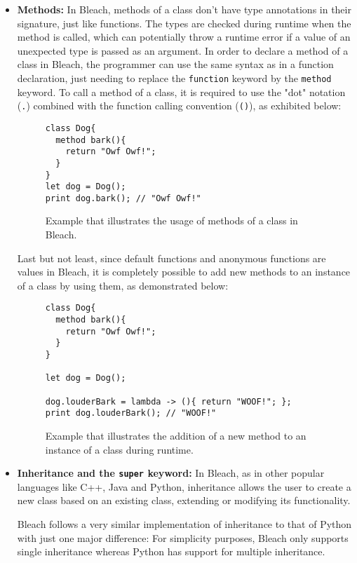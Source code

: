 \begin{itemize}
    \item \textbf{Methods:} In Bleach, methods of a class don't have type annotations in their signature, just like functions. The types are checked during runtime when the method is called, which can potentially throw a runtime error if a value of an unexpected type is passed as an argument. In order to declare a method of a class in Bleach, the programmer can use the same syntax as in a function declaration, just needing to replace the \texttt{function} keyword by the \texttt{method} keyword. To call a method of a class, it is required to use the "dot" notation (\texttt{.}) combined with the function calling convention (\texttt{()}), as exhibited below:
\begin{figure}[H]
    \centering
    \begin{lstlisting}
class Dog{
  method bark(){
    return "Owf Owf!";
  }
}
let dog = Dog();
print dog.bark(); // "Owf Owf!"
    \end{lstlisting}
    \caption{Example that illustrates the usage of methods of a class in Bleach.}
\end{figure}

    Last but not least, since default functions and anonymous functions are values in Bleach, it is completely possible to add new methods to an instance of a class by using them, as demonstrated below:
\begin{figure}[H]
    \centering
    \begin{lstlisting}
class Dog{
  method bark(){
    return "Owf Owf!";
  }
}

let dog = Dog();

dog.louderBark = lambda -> (){ return "WOOF!"; };
print dog.louderBark(); // "WOOF!"
    \end{lstlisting}
    \caption{Example that illustrates the addition of a new method to an instance of a class during runtime.}
\end{figure}

    \item \textbf{Inheritance and the \texttt{super} keyword:} In Bleach, as in other popular languages like C++, Java and Python, inheritance allows the user to create a new class based on an existing class, extending or modifying its functionality.

    Bleach follows a very similar implementation of inheritance to that of Python with just one major difference: For simplicity purposes, Bleach only supports single inheritance whereas Python has support for multiple inheritance.


\end{itemize}
